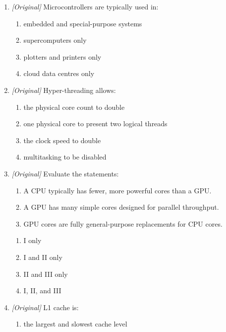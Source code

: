 \documentclass[11pt]{article}
\begin{document}
\begin{enumerate}[label=\textbf{Q\arabic*.}, leftmargin=*]
\begin{enumerate}[label=\Alph*.]
    \item a large mainframe processor
    \item a GPU with many cores
    \item a microprocessor plus integrated memory and I/O peripherals on one
      chip
  \end{enumerate}
\item \textit{[Original]} Microcontrollers are typically used in:
  \begin{enumerate}[label=\Alph*.]
    \item embedded and special-purpose systems
    \item supercomputers only
    \item plotters and printers only
    \item cloud data centres only
  \end{enumerate}
\item \textit{[Original]} Hyper-threading allows:
  \begin{enumerate}[label=\Alph*.]
    \item the physical core count to double
    \item one physical core to present two logical threads
    \item the clock speed to double
    \item multitasking to be disabled
  \end{enumerate}
\item \textit{[Original]} Evaluate the statements:
  \begin{enumerate}[label=\Roman*.]
    \item A CPU typically has fewer, more powerful cores than a GPU.
    \item A GPU has many simple cores designed for parallel throughput.
    \item GPU cores are fully general-purpose replacements for CPU cores.
  \end{enumerate}
  \begin{enumerate}[label=\Alph*.]
    \item I only
    \item I and II only
    \item II and III only
    \item I, II, and III
  \end{enumerate}
\item \textit{[Original]} L1 cache is:
  \begin{enumerate}[label=\Alph*.]
    \item the largest and slowest cache level

\end{enumerate}
\end{enumerate}
\end{document}
